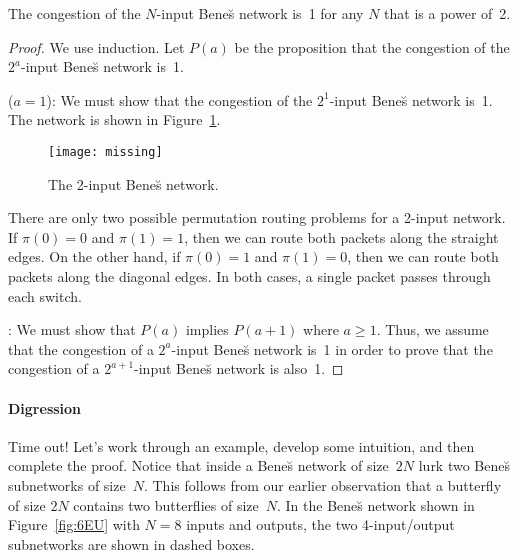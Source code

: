 \begin{theorem}\label{thm:benes_congestion}
The congestion of the $N$-input Bene\u{s} network is~1 for any $N$
that is a power of~2.
\end{theorem}

\begin{proof}
We use induction.  Let $P(a)$ be the proposition that the congestion of
the $2^a$-input Bene\u{s} network is~1.

 ($a = 1$): We must show that the congestion
of the $2^1$-input Bene\u{s} network is~1.  The network is shown in
Figure~\ref{fig:6ET}.

\begin{figure}


\texttt{[image: missing]}

\caption{The 2-input Bene\u{s} network.}

\label{fig:6ET}

\end{figure}

There are only two possible permutation routing problems for a 2-input
network.  If $\pi(0) = 0$ and $\pi(1) = 1$, then we can route both
packets along the straight edges.  On the other hand, if $\pi(0) = 1$
and $\pi(1) = 0$, then we can route both packets along the diagonal
edges.  In both cases, a single packet passes through each switch.

: We must show that $P(a)$ implies $P(a
+ 1)$ where $a \ge 1$.  Thus, we assume that the congestion of a
$2^a$-input Bene\u{s} network is~1 in order to prove that the
congestion of a $2^{a + 1}$-input Bene\u{s} network is also~1.

\noqed

\end{proof}

\paragraph{Digression}

Time out!  Let's work through an example, develop some intuition, and
then complete the proof.  Notice that inside a Bene\u{s} network of
size~$2N$ lurk two Bene\u{s} subnetworks of size~$N$.  This follows
from our earlier observation that a butterfly of size $2N$ contains
two butterflies of size~$N$.  In the Bene\u{s} network shown in
Figure~\ref{fig:6EU} with $N=8$ inputs and outputs, the two
4-input/output subnetworks are shown in dashed boxes.

